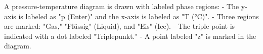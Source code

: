 A pressure-temperature diagram is drawn with labeled phase regions:  
- The y-axis is labeled as "p (Enter)" and the x-axis is labeled as "T (°C)".  
- Three regions are marked: "Gas," "Flüssig" (Liquid), and "Eis" (Ice).  
- The triple point is indicated with a dot labeled "Triplepunkt."  
- A point labeled "z" is marked in the diagram.